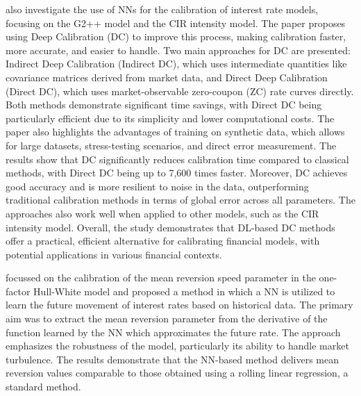 \textcite{alaya2021deep} also investigate the use of NNs for the calibration of interest rate models, focusing on the G2++ model and the CIR intensity model. The paper proposes using Deep Calibration (DC) to improve this process, making calibration faster, more accurate, and easier to handle. Two main approaches for DC are presented: Indirect Deep Calibration (Indirect DC), which uses intermediate quantities like covariance matrices derived from market data, and Direct Deep Calibration (Direct DC), which uses market-observable zero-coupon (ZC) rate curves directly. Both methods demonstrate significant time savings, with Direct DC being particularly efficient due to its simplicity and lower computational costs. The paper also highlights the advantages of training on synthetic data, which allows for large datasets, stress-testing scenarios, and direct error measurement. The results show that DC significantly reduces calibration time compared to classical methods, with Direct DC being up to 7,600 times faster. Moreover, DC achieves good accuracy and is more resilient to noise in the data, outperforming traditional calibration methods in terms of global error across all parameters. The approaches also work well when applied to other models, such as the CIR intensity model. Overall, the study demonstrates that DL-based DC methods offer a practical, efficient alternative for calibrating financial models, with potential applications in various financial contexts.

\textcite{moysiadis2019calibrating} focussed on the calibration of the mean reversion speed parameter in the one-factor Hull-White model and proposed a method in which a NN is utilized to learn the future movement of interest rates based on historical data. The primary aim was to extract the mean reversion parameter from the derivative of the function learned by the NN which approximates the future rate. The approach emphasizes the robustness of the model, particularly its ability to handle market turbulence. The results demonstrate that the NN-based method delivers mean reversion values comparable to those obtained using a rolling linear regression, a standard method.